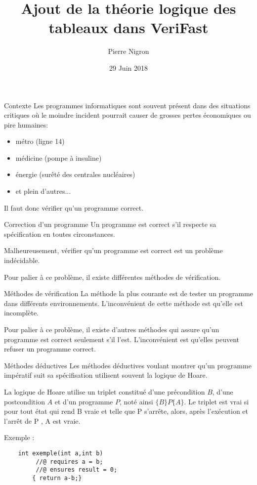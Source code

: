 \documentclass[9pt]{beamer}
\title{Ajout de la th\'eorie logique des tableaux dans VeriFast}
\author{Pierre Nigron}
\date{29 Juin 2018}
\begin{document}
\frame{\titlepage}

\begin{frame}{Contexte}
  	Les programmes informatiques sont souvent pr\'esent dans des situations critiques o\`u le moindre incident pourrait causer de grosses pertes \'economiques ou pire humaines:
  	\begin{itemize}  	
  	\item m\'etro (ligne 14)
  	\item m\'edicine (pompe \`a insuline)
  	\item \'energie (sur\^et\'e des centrales nucl\'eaires)
  	\item et plein d'autres...
  	\end{itemize}
  	Il faut donc v\'erifier qu'un programme correct.
\end{frame}

\begin{frame}{Correction d'un programme}
	Un programme est correct s'il respecte sa sp\'ecification en toutes circonstances.
	
	Malheureusement, v\'erifier qu'un programme est correct est un probl\`eme ind\'ecidable.
	
	Pour palier \`a ce probl\`eme, il existe diff\'erentes m\'ethodes de v\'erification. 
	
\end{frame}

\begin{frame}{M\'ethodes de v\'erification}
	La m\'ethode la plus courante est de tester un programme dans diff\'erents environnements. L'inconv\'enient de cette m\'ethode est qu'elle est incompl\`ete.
	
	Pour palier \`a ce probl\`eme, il existe d'autres m\'ethodes qui assure qu'un programme est correct seulement s'il l'est. L'inconv\'enient est qu'elles peuvent refuser un programme correct.

\end{frame}


\begin{frame}[fragile]{M\'ethodes d\'eductives}
	Les m\'ethodes d\'eductives voulant montrer qu'un programme imp\'eratif suit sa sp\'ecifisation utilisent souvent la logique de Hoare.
	
	La logique de Hoare utilise un triplet constitu\'e d'une pr\'econdition $B$, d'une postcondition $A$ et d'un programme $P$, not\'e ainsi $\{B\}P\{A\}$. Le triplet est vrai si pour tout \'etat qui rend B vraie et telle que P s'arr\^ete, alors, apr\`es l'ex\'ecution et l'arr\^et de P , A est vraie.

Exemple :
	\begin{lstlisting}
	int exemple(int a,int b)
		 //@ requires a = b;
		 //@ ensures result = 0;
		{ return a-b;}
	\end{lstlisting}
\end{frame}
\end{document}
